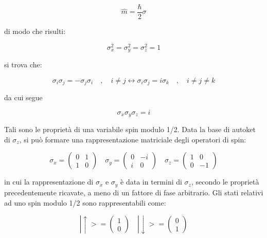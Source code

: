 \documentclass{article}
\begin{document}
\begin{equation}
    \hat{m}=\frac{\hbar}{2}\sigma
\end{equation}

di modo che risulti:

\begin{equation}
    \sigma_x^2=\sigma_y^2=\sigma_z^2=1
\end{equation}

si trova che:

\begin{equation}
    \sigma_i \sigma_j= -\sigma_j \sigma_i \quad , \quad i \neq j \leftrightarrow \sigma_i \sigma_j= i\sigma_k \quad , \quad i \neq j \neq k
\end{equation}

da cui segue

\begin{equation}
    \sigma_x \sigma_y \sigma_z = i
\end{equation}

Tali sono le proprietà di una variabile spin modulo 1/2.
Data la base di autoket di $\sigma_z$, si può formare una rappresentazione matriciale
degli operatori di spin:

\begin{equation}
    \sigma_x=\begin{pmatrix}
        0 & 1 \\
        1 & 0
    \end{pmatrix}
    \quad
    \sigma_y=\begin{pmatrix}
        0 & -i \\
        i & 0
    \end{pmatrix}
    \quad
    \sigma_z=\begin{pmatrix}
        1 & 0  \\
        0 & -1
    \end{pmatrix}
\end{equation}

in cui la rappresentazione di $\sigma_x$ e $\sigma_y$ è data in termini di $\sigma_z$, secondo le proprietà precedentemente ricavate, a meno di
un fattore di fase arbitrario.
Gli stati relativi ad uno spin modulo 1/2 sono rappresentabili come:

\begin{equation}
    |\uparrow>=\begin{pmatrix}
        1 \\
        0
    \end{pmatrix}
    \quad
    |\downarrow>=\begin{pmatrix}
        0 \\
        1
    \end{pmatrix}
\end{equation}
\end{document}
